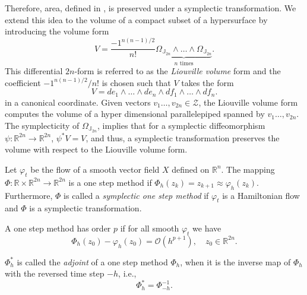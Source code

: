 Therefore, area, defined in , is preserved under a symplectic transformation. We extend this idea to the volume of a compact subset of a hypersurface by introducing the volume form
\begin{equation*}
	V = \frac{-1^{n(n-1)/2}}{n!} \underbrace{\Omega_{\mathbb J_{2n}} \wedge \dots \wedge \Omega_{\mathbb J_{2n}}}_{n \text{ times}}.
\end{equation*}
This differential $2n$-form is referred to as the  \emph{Liouville volume} \cite{marsden2013introduction} form and the coefficient ${-1^{n(n-1)/2}}/{n!}$ is chosen such that $V$ takes the form
\begin{equation}\label{eq:2.22}
	V = de_1 \wedge \dots \wedge de_n \wedge df_1 \wedge \dots \wedge df_n. 
\end{equation}
in a canonical coordinate. Given vectors $v_1\dots,v_{2n}\in \mathcal Z$, the Liouville volume form computes the volume of a hyper dimensional parallelepiped spanned by $v_1\dots,v_{2n}$. The symplecticity of $\Omega_{\mathbb J_{2n}}$, implies that for a symplectic diffeomorphism $\psi:\mathbb R^{2n} \to \mathbb{R}^{2n}$, $\psi^*V = V$, and thus, a symplectic transformation preserves the volume with respect to the Liouville volume form.

\begin{definition}
Let $\varphi_t$ be the flow of a smooth vector field $X$ defined on $\mathbb R^{n}$. The mapping $\Phi:\mathbb R \times \mathbb R^{2n} \to \mathbb R^{2n}$ is a one step method if $\Phi_h (z_k) = z_{k+1} \approx \varphi_h(z_k)$. Furthermore, $\Phi$ is called a \emph{symplectic one step method} if $\varphi_t$ is a Hamiltonian flow and $\Phi$ is a symplectic transformation.
\end{definition}

\begin{definition}
A one step method has order $p$ if for all smooth $\varphi_t$ we have
\begin{equation} \label{eq:2.23}
	\Phi_h(z_0) - \varphi_h(z_0) = \mathcal O(h^{p+1}), \quad z_0 \in \mathbb R^{2n}.
\end{equation}
\end{definition}

\begin{definition}
	$\Phi_h^*$ is called the \emph{adjoint} of a one step method $\Phi_h$, when it is the inverse map of $\Phi_h$ with the reversed time step $-h$, i.e.,
\begin{equation} \label{eq:2.24}
	\Phi_h^* = \Phi^{-1}_{-h}.
\end{equation}
\end{definition}


